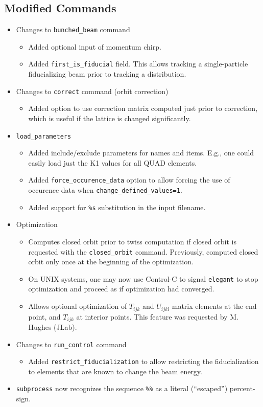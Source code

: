 \documentclass[11pt]{article}
\begin{document}
\subsection{Modified Commands}
\begin{itemize}
\item Changes to \verb|bunched_beam| command
	\begin{itemize}
	\item Added optional input of momentum chirp.
	\item Added \verb|first_is_fiducial| field.  This allows tracking a
	single-particle fiducializing beam prior to tracking a distribution.
	\end{itemize}
\item Changes to \verb|correct| command (orbit correction)
	\begin{itemize}
	\item Added option to use correction matrix computed just prior to 
	correction, which is useful if the lattice is changed significantly.
	\end{itemize}
\item \verb|load_parameters|
	\begin{itemize}
	\item Added include/exclude parameters for names and items.  E.g.,
	one could easily load just the K1 values for all QUAD elements.
	\item Added \verb|force_occurence_data| option to allow forcing
	the use of occurence data when \verb|change_defined_values=1|.
	\item Added support for \verb|%s| substitution in the input filename.
	\end{itemize}
\item Optimization
	\begin{itemize}
	\item Computes closed orbit prior to twiss computation if closed
	orbit is requested with the \verb|closed_orbit| command. Previously,
	computed closed orbit only once at the beginning of the optimization.
	\item On UNIX systems, one may now use Control-C to signal \verb|elegant|
	to stop optimization and proceed as if optimization had converged.
	\item Allows optional optimization of 
	$T_{ijk}$ and $U_{ijkl}$ matrix elements
	at the end point, and $T_{ijk}$ at interior points.
	This feature was requested by M. Hughes (JLab).
	\end{itemize}
\item Changes to \verb|run_control| command 
	\begin{itemize}
	\item Added \verb|restrict_fiducialization| to allow restricting the
	fiducialization to elements that are known to change the beam energy.
	\end{itemize}
\item \verb|subprocess| now recognizes the sequence \verb|%%| as a literal
	(``escaped'') percent-sign.  
\end{itemize}
\end{document}
